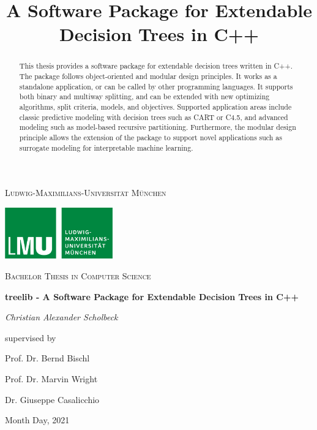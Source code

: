 \documentclass[a4paper, 11pt]{article}
\begin{document}
\title{A Software Package for Extendable Decision Trees in C++}

\begin{titlepage}
	\centering
	\vspace{1cm}
	{\scshape\LARGE Ludwig-Maximilians-Universität München \par}
	\vspace{1.5cm}
	\includegraphics[width=0.35\textwidth]{figure/lmu_logo.png}\par\vspace{1cm}
	\vspace{0.5cm}
	{\scshape\Large Bachelor Thesis in Computer Science\par}
	\vspace{1.5cm}
	{\huge\bfseries treelib - A Software Package for Extendable Decision Trees in C++\par}
	\vspace{2cm}
	{\Large\itshape Christian Alexander Scholbeck\par}
	\vfill
	supervised by\par
	Prof. Dr. Bernd Bischl \par
	Prof. Dr. Marvin Wright \par
	Dr. Giuseppe Casalicchio

	\vfill

	{\large Month Day, 2021 \par}
\end{titlepage}

\newpage
\thispagestyle{empty}

\vspace*{4cm}
\begin{abstract}
This thesis provides a software package for extendable decision trees written in C++. The package follows object-oriented and modular design principles. It works as a standalone application, or can be called by other programming languages. It supports both binary and multiway splitting, and can be extended with new optimizing algorithms, split criteria, models, and objectives. Supported application areas include classic predictive modeling with decision trees such as CART or C4.5, and advanced modeling such as model-based recursive partitioning. Furthermore, the modular design principle allows the extension of the package to support novel applications such as surrogate modeling for interpretable machine learning.

\end{abstract}
\vspace{2cm}
\tableofcontents
\clearpage
\setcounter{page}{1}
\end{document}
